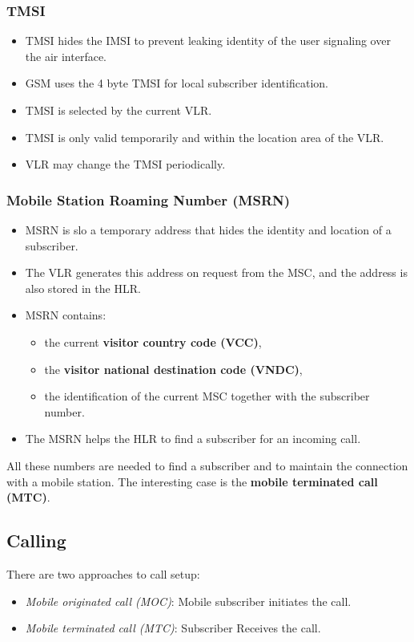 \subsubsection{TMSI}

\begin{itemize}
	\item TMSI hides the IMSI to prevent leaking identity of the user signaling over the air interface. 
	\item GSM uses the 4 byte TMSI for local subscriber identification.
	\item TMSI is selected by the current VLR.
	\item TMSI is only valid temporarily and within the location area of the VLR.
	\item VLR may change the TMSI periodically.
\end{itemize}

\subsubsection[MSRN]{Mobile Station Roaming Number (MSRN)}
\begin{itemize}
	\item MSRN is slo a temporary address that hides the identity and location of a subscriber.
	\item The VLR generates this address on request from the MSC, and the address is also stored in the HLR.
	\item MSRN contains:
	\begin{itemize}
		\item the current \textbf{visitor country code (VCC)}, 
		\item the \textbf{visitor national destination code (VNDC)}, 
		\item the identification of the current MSC together with the subscriber number.
	\end{itemize}
\item The MSRN helps the HLR to find a subscriber for an incoming call.
\end{itemize}

\noindent All these numbers are needed to find a subscriber and to maintain the connection with a mobile station. The interesting case is the \textbf{mobile terminated call (MTC)}.

\subsection{Calling}
There are two approaches to call setup:
\begin{itemize}
	\item \textit{Mobile originated call (MOC)}: Mobile subscriber initiates the call.
	\item \textit{Mobile terminated call (MTC)}: Subscriber Receives the call.
\end{itemize}
